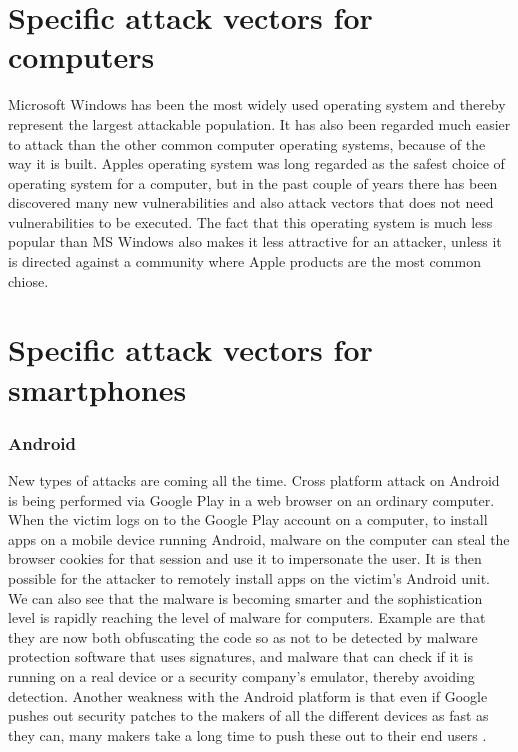 \section{Specific attack vectors for computers}
Microsoft Windows has been the most widely used operating system and thereby represent the largest attackable population. It has also been regarded much easier to attack than the other common computer operating systems, because of the way it is built. 
Apples operating system was long regarded as the safest choice of operating system for a computer, but in the past couple of years there has been discovered many new vulnerabilities and also attack vectors that does not need vulnerabilities to be executed. The fact that this operating system is much less popular than MS Windows also makes it less attractive for an attacker, unless it is directed against a community where Apple products are the most common chiose.
\section{Specific attack vectors for smartphones}
\subsubsection{Android}
New types of attacks are coming all the time. Cross platform attack on Android is being performed via Google Play in a web browser on an ordinary computer. When the victim logs on to the Google Play account on a computer, to install apps on a mobile device running Android, malware on the computer can steal the browser cookies for that session and use it to impersonate the user. It is then possible for the attacker to remotely install apps on the victim’s Android unit. We can also see that the malware is becoming smarter and the sophistication level is rapidly reaching the level of malware for computers. Example are that they are now both obfuscating the code so as not to be detected by malware protection software that uses signatures, and malware that can check if it is running on a real device or a security company’s emulator, thereby avoiding detection. Another weakness with the Android platform is that even if Google pushes out security patches to the makers of all the different devices as fast as they can, many makers take a long time to push these out to their end users \cite{ISTR2016}.
